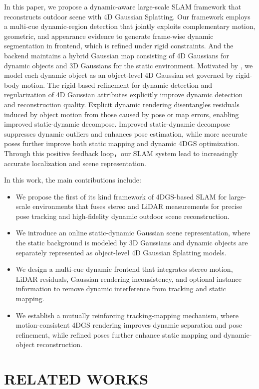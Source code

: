 \documentclass[letterpaper, 10 pt, conference]{ieeeconf}  %
\begin{document}
In this paper, we propose a dynamic-aware large-scale SLAM framework that reconstructs outdoor scene with 4D Gaussian Splatting. Our framework employs a multi-cue dynamic-region detection that jointly exploits complementary motion, geometric, and appearance evidence to generate frame-wise dynamic segmentation in frontend, which is refined under rigid constraints. And the backend maintains a hybrid Gaussian map consisting of 4D Gaussians for dynamic objects and 3D Gaussians for the static environment. Motivated by \cite{rigidmask,4dgs-slam}, we model each dynamic object as an object-level 4D Gaussian set governed by rigid-body motion. The rigid-based refinement for dynamic detection and regularization of 4D Gaussian attributes explicitly improve dynamic detection and reconstruction quality.
Explicit dynamic rendering disentangles residuals induced by object motion from those caused by pose or map errors, enabling improved static-dynamic decompose. Improved static-dynamic decompose suppresses dynamic outliers and enhances pose estimation, while more accurate poses further improve both static mapping and dynamic 4DGS optimization. Through this positive feedback loop，our SLAM system lead to increasingly accurate localization and scene representation.

In this work, the main contributions include:
\begin{itemize}
\item We propose the first of its kind framework of 4DGS-based SLAM for large-scale environments that fuses stereo and LiDAR measurements for precise pose tracking and high-fidelity dynamic outdoor scene reconstruction.
\item We introduce an online static-dynamic Gaussian scene representation, where the static background is modeled by 3D Gaussians and dynamic objects are separately represented as object-level 4D Gaussian Splatting models.
\item We design a multi-cue dynamic frontend that integrates stereo motion, LiDAR residuals, Gaussian rendering inconsistency, and optional instance information to remove dynamic interference from tracking and static mapping.
\item We establish a mutually reinforcing tracking-mapping mechanism, where motion-consistent 4DGS rendering improves dynamic separation and pose refinement, while refined poses further enhance static mapping and dynamic-object reconstruction.
\end{itemize}

\section{RELATED WORKS}
\end{document}

